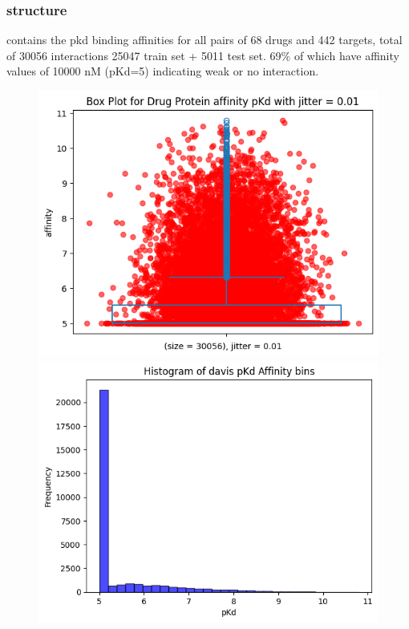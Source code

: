 \documentclass[11pt, a4paper]{article}
\begin{document}
        \subsubsection{structure}
            contains the pkd binding affinities for all pairs of 68 drugs and 442 targets, total of 30056 interactions
            25047 train set + 5011 test set.
            69\% of which have affinity values of 10000 nM (pKd=5) indicating weak or no interaction.
            \begin{figure}[H]
                \centering
                \begin{minipage}{0.45\textwidth}
                \includegraphics[width=\textwidth]{davis/boxplot.png}
                \end{minipage}
                \hfill
                \begin{minipage}{0.45\textwidth}
                \includegraphics[width=\textwidth]{davis/histogram.png}
                \end{minipage}
            \end{figure}
\end{document}
